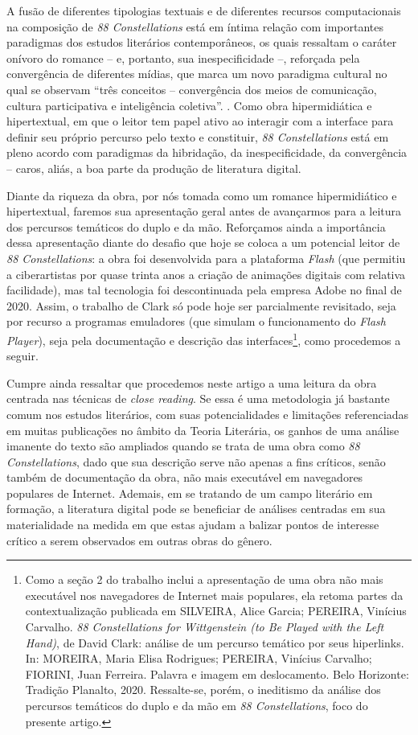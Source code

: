 \documentclass[portuguese]{textolivre}
\begin{document}
A fusão de diferentes tipologias textuais e de diferentes recursos computacionais na composição de \emph{88 Constellations} está em íntima relação com importantes paradigmas dos estudos literários contemporâneos, os quais ressaltam o caráter onívoro do romance \cite{perrone-moises2016} – e, portanto, sua inespecificidade \cite{garramuno2014} –, reforçada pela convergência de diferentes mídias, que marca um novo paradigma cultural no qual se observam “três conceitos – convergência dos meios de comunicação, cultura participativa e inteligência coletiva”. \cite[p. 29]{jenkins2009}. Como obra hipermidiática e hipertextual, em que o leitor tem papel ativo ao interagir com a interface para definir seu próprio percurso pelo texto e constituir, \emph{88 Constellations} está em pleno acordo com paradigmas da hibridação, da inespecificidade, da convergência – caros, aliás, a boa parte da produção de literatura digital.

Diante da riqueza da obra, por nós tomada como um romance hipermidiático e hipertextual, faremos sua apresentação geral antes de avançarmos para a leitura dos percursos temáticos do duplo e da mão. Reforçamos ainda a importância dessa apresentação diante do desafio que hoje se coloca a um potencial leitor de \emph{88 Constellations}: a obra foi desenvolvida para a plataforma \emph{Flash} (que permitiu a ciberartistas por quase trinta anos a criação de animações digitais com relativa facilidade), mas tal tecnologia foi descontinuada pela empresa Adobe no final de 2020. Assim, o trabalho de Clark só pode hoje ser parcialmente revisitado, seja por recurso a programas emuladores (que simulam o funcionamento do \emph{Flash Player}), seja pela documentação e descrição das interfaces\footnote{Como a seção 2 do trabalho inclui a apresentação de uma obra não mais executável nos navegadores de Internet mais populares, ela retoma partes da contextualização publicada em SILVEIRA, Alice Garcia; PEREIRA, Vinícius Carvalho. \emph{88 Constellations for Wittgenstein (to Be Played with the Left Hand)}, de David Clark: análise de um percurso temático por seus hiperlinks. In: MOREIRA, Maria Elisa Rodrigues; PEREIRA, Vinícius Carvalho; FIORINI, Juan Ferreira. Palavra e imagem em deslocamento. Belo Horizonte: Tradição Planalto, 2020. Ressalte-se, porém, o ineditismo da análise dos percursos temáticos do duplo e da mão em \emph{88 Constellations}, foco do presente artigo.}, como procedemos a seguir.

Cumpre ainda ressaltar que procedemos neste artigo a uma leitura da obra centrada nas técnicas de \emph{close reading}. Se essa é uma metodologia já bastante comum nos estudos literários, com suas potencialidades e limitações referenciadas em muitas publicações no âmbito da Teoria Literária, os ganhos de uma análise imanente do texto são ampliados quando se trata de uma obra como \emph{88 Constellations}, dado que sua descrição serve não apenas a fins críticos, senão também de documentação da obra, não mais executável em navegadores populares de Internet. Ademais, em se tratando de um campo literário em formação, a literatura digital pode se beneficiar de análises centradas em sua materialidade na medida em que estas ajudam a balizar pontos de interesse crítico a serem observados em outras obras do gênero. 
\end{document}
